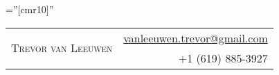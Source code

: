 \documentclass[letterpaper,10pt]{article}
\begin{document}
\pagestyle{empty} %

\font\fb=''[cmr10]'' %

\begin{adjustwidth}{-0.2cm}{}
\par{
    \begin{tabular}{lr}
        \multirow{2}{13.15cm}{\Huge{\textsc{Trevor van Leeuwen}}} & \href{mailto:vanleeuwen.trevor@gmail.com}{vanleeuwen.trevor@gmail.com} \\
         & +1 (619) 885-3927
    \end{tabular}
\medskip\par}

\end{adjustwidth}


\end{document}
